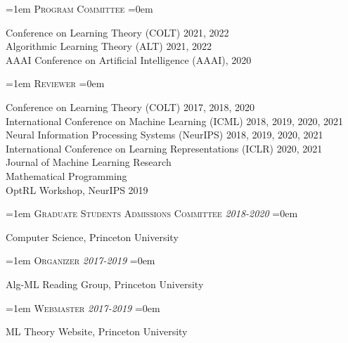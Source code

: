 \documentclass{scrartcl}
\newcommand{\NewEntry}[3]{\noindent\hangindent=1em\hangafter=0 #2 \hfill \textit{#1}  #3 
\vspace{0.5em}}
\newcommand{\Description}[1]{\hangindent=0em\hangafter=0\noindent\raggedright {#1}\par\normalsize\vspace{1em}}
\newcommand{\spacedlowallcaps}[1]{{\Large\textls[80]{\scshape \MakeTextLowercase{#1}}}}
\begin{document}
\begin{cv}{}
\vspace{0.5em}

\noindent\spacedlowallcaps{Service}

\hspace{0.5em}

\NewEntry{}{\textsc{\color{Maroon} Program Committee}}

\vspace{-0.2em}\hspace{0.8em}
\Description{Conference on Learning Theory (COLT) 2021, 2022\\
\hspace{1em}Algorithmic Learning Theory (ALT) 2021, 2022\\
\hspace{1em}AAAI Conference on Artificial Intelligence (AAAI), 2020 }

\NewEntry{}{\textsc{\color{Maroon} Reviewer}}

\vspace{-0.2em}\hspace{0.8em}
\Description{Conference on Learning Theory (COLT) 2017, 2018, 2020 \\
\hspace{1em}International Conference on Machine Learning (ICML) 2018, 2019, 2020, 2021\\
\hspace{1em}Neural Information Processing Systems (NeurIPS) 2018, 2019, 2020, 2021\\
\hspace{1em}International Conference on Learning Representations (ICLR) 2020, 2021\\
\hspace{1em}Journal of Machine Learning Research\\
\hspace{1em}Mathematical Programming\\
\hspace{1em}OptRL Workshop, NeurIPS 2019
}

\NewEntry{2018-2020}{\textsc{\color{Maroon} Graduate Students Admissions Committee}}

\vspace{-0.2em}\hspace{0.8em}
\Description{Computer Science, Princeton University}

\NewEntry{2017-2019}{\textsc{\color{Maroon} Organizer}}

\vspace{-0.2em}\hspace{0.8em}
\Description{Alg-ML Reading Group, Princeton University}

\NewEntry{2017-2019}{\textsc{\color{Maroon} Webmaster}}

\vspace{-0.2em}\hspace{0.8em}
\Description{ML Theory Website, Princeton University}


\end{cv}
\end{document}
